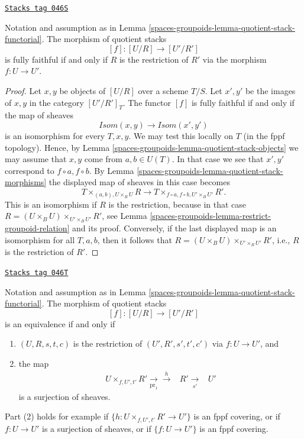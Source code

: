 \begin{lemma}
\label{spaces-groupoids-lemma-quotient-stack-restrict}
\href{https://stacks.math.columbia.edu/tag/046S}{\texttt{Stacks tag 046S}}

Notation and assumption as in
Lemma \ref{spaces-groupoids-lemma-quotient-stack-functorial}.
The morphism of quotient stacks
$$
[f] : [U/R] \longrightarrow [U'/R']
$$
is fully faithful if and only if $R$ is the restriction of
$R'$ via the morphism $f : U \to U'$.
\end{lemma}

\begin{proof}
Let $x, y$ be objects of $[U/R]$ over a scheme $T/S$.
Let $x', y'$ be the images of $x, y$ in the category $[U'/R']_T$.
The functor $[f]$ is fully faithful if and only if the map of sheaves
$$
\mathit{Isom}(x, y) \longrightarrow \mathit{Isom}(x', y')
$$
is an isomorphism for every $T, x, y$. We may test this locally on $T$
(in the fppf topology). Hence, by
Lemma \ref{spaces-groupoids-lemma-quotient-stack-objects}
we may assume that $x, y$ come from $a, b \in U(T)$.
In that case we see that $x', y'$ correspond to $f \circ a, f \circ b$. By
Lemma \ref{spaces-groupoids-lemma-quotient-stack-morphisms}
the displayed map of sheaves in this case becomes
$$
T \times_{(a, b), U \times_B U} R
\longrightarrow
T \times_{f \circ a, f \circ b, U' \times_B U'} R'.
$$
This is an isomorphism if $R$ is the restriction, because in that case
$R = (U \times_B U) \times_{U' \times_B U'} R'$, see
Lemma \ref{spaces-groupoids-lemma-restrict-groupoid-relation}
and its proof. Conversely, if the last displayed map is an isomorphism
for all $T, a, b$, then it follows that
$R = (U \times_B U) \times_{U' \times_B U'} R'$, i.e.,
$R$ is the restriction of $R'$.
\end{proof}

\begin{lemma}
\label{spaces-groupoids-lemma-quotient-stack-restrict-equivalence}
\href{https://stacks.math.columbia.edu/tag/046T}{\texttt{Stacks tag 046T}}

Notation and assumption as in
Lemma \ref{spaces-groupoids-lemma-quotient-stack-functorial}.
The morphism of quotient stacks
$$
[f] : [U/R] \longrightarrow [U'/R']
$$
is an equivalence if and only if
\begin{enumerate}
\item $(U, R, s, t, c)$ is the restriction of $(U', R', s', t', c')$
via $f : U \to U'$, and
\item the map
$$
\begin{array}{ccc}U \times_{f, U', t'} R' \underset{\text{pr}_1}{\longrightarrow}\overset{h}{\longrightarrow} & R' \underset{s'}{\longrightarrow} & U'\end{array}
$$
is a surjection of sheaves.
\end{enumerate}
Part (2) holds for example if $\{h : U \times_{f, U', t'} R' \to U'\}$
is an fppf covering, or if $f : U \to U'$ is a surjection of sheaves, or if
$\{f : U \to U'\}$ is an fppf covering.
\end{lemma}

